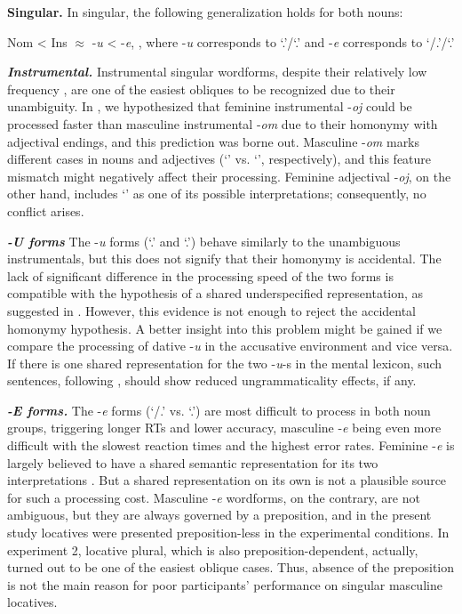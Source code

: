 \documentclass[output=paper, modfonts,newtxmath,hidelinks]{langscibook}
\begin{document}
\textbf{Singular.} In singular, the following generalization holds for both nouns:

\ea	Nom < Ins $\approx$ -\textit{u} < -\textit{e}, , where -\textit{u} corresponds to `\accc.\fem'\slash `\datt.\masc' and -\textit{e} corresponds to `{\datt/\locc.\fem}’\slash `{\locc.\masc}’
\z 

\textbf{\textit{Instrumental.}} Instrumental singular wordforms, despite their relatively low frequency \citep{samojlova2014frequencies}, are one of the easiest obliques to be recognized due to their unambiguity. In , we hypothesized that feminine instrumental -\textit{oj} could be processed faster than masculine instrumental -\textit{om} due to their homonymy with adjectival endings, and this prediction was borne out. Masculine -\textit{om} marks different cases in nouns and adjectives (`\ins' vs. `\locc', respectively), and this feature mismatch might negatively affect their processing. Feminine adjectival -\textit{oj}, on the other hand, includes `\ins' as one of its possible interpretations; consequently, no conflict arises.

\textbf{\textit{-U forms}} The -\textit{u} forms (`\accc.\fem' and `\datt.\masc') behave similarly to the unambiguous instrumentals, but this does not signify that their homonymy is accidental. The lack of significant difference in the processing speed of the two forms  is compatible with the hypothesis of a shared underspecified representation, as suggested in  \citet{muller2004decomposing,wunderlich2004there}. However, this evidence is not enough to reject the accidental homonymy hypothesis. A better insight into this problem might be gained if we compare the processing of dative -\textit{u} in the accusative environment and vice versa. If there is one shared representation for the two -\textit{u}-s in the mental lexicon, such sentences, following \citet{penke2004psycholinguistic, opitz2013neurophysiological}, should show reduced ungrammaticality effects, if any.

\textbf{\textit{-E forms.}} The -\textit{e} forms (`\datt/\locc.\fem' vs. `\locc.\masc') are most difficult to process in both noun groups, triggering longer RTs and lower accuracy, masculine -\textit{e} being even more difficult with the slowest reaction times and the highest error rates. Feminine -\textit{e} is largely believed to have a shared semantic representation for its two interpretations \citep{muller2004decomposing, wiese2004categories, wunderlich2004there}. But a shared representation on its own is not a plausible source for such a processing cost. Masculine -\textit{e} wordforms, on the contrary, are not ambiguous, but they are always governed by a preposition, and in the present study locatives were presented preposition-less in the experimental conditions. In experiment 2, locative plural, which is also preposition-dependent, actually, turned out to be one of the easiest oblique cases. Thus, absence of the preposition is not the main reason for poor participants’ performance on singular masculine locatives. 
\end{document}
